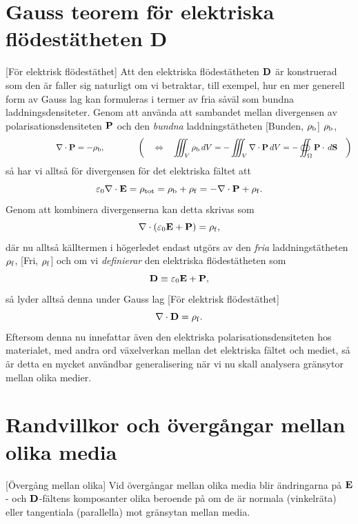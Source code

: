 {{{{{\section{Gauss teorem f{\"o}r elektriska fl{\"o}dest{\"a}theten {\bf D}}
[F{\"o}r elektrisk fl{\"o}dest{\"a}thet]
Att den elektriska fl{\"o}dest{\"a}theten ${\bf D}$
 {\"a}r konstruerad som den
{\"a}r faller sig naturligt om vi betraktar, till exempel, hur en mer generell
form av Gauss lag kan formuleras i termer av fria s{\aa}v{\"a}l som bundna
laddningsdensiteter.
Genom att anv{\"a}nda att sambandet mellan divergensen av
polarisationsdensiteten ${\bf P}$  och
den {\it bundna} laddningst{\"a}theten 
[Bunden, $\rho_{\rm b}$]
$\rho_{\rm b}$,
$$
  \qquad
  \qquad
  \qquad
  \nabla\cdot{\bf P} = -\rho_{\rm b},
  \qquad\qquad
  \bigg(\quad\Leftrightarrow\quad
  \iiint_V \rho_{\rm b}\,dV
    = -\iiint_V\nabla\cdot{\bf P}\,dV
    = -\oiint_{\Omega}{\bf P}\cdot\,d{\bf S}
    \quad\bigg)
$$
s{\aa} har vi allts{\aa} f{\"o}r divergensen f{\"o}r det elektriska f{\"a}ltet
att
$$
  \varepsilon_0\nabla\cdot{\bf E}
    =\rho_{\rm tot}
    =\rho_{\rm b}+\rho_{\rm f}
    =-\nabla\cdot{\bf P}+\rho_{\rm f}.
$$
Genom att kombinera divergenserna kan detta skrivas som
$$
  \nabla\cdot(\varepsilon_0{\bf E}+{\bf P})=\rho_{\rm f},
$$
d{\"a}r nu allts{\aa} k{\"a}lltermen i h{\"o}gerledet endast utg{\"o}rs av den
{\it fria} laddningst{\"a}theten $\rho_{\rm f}$,
[Fri, $\rho_{\rm f}$]
och om vi {\it definierar} den elektriska fl{\"o}dest{\"a}theten som
$$
  {\bf D}\equiv\varepsilon_0{\bf E}+{\bf P},
$$
s{\aa} lyder allts{\aa} denna under Gauss lag
[F{\"o}r elektrisk fl{\"o}dest{\"a}thet]
$$
  \nabla\cdot{\bf D}=\rho_{\rm f}.
$$
Eftersom denna nu innefattar {\"a}ven den elektriska polarisationsdensiteten
 hos materialet, med andra ord
v{\"a}xelverkan mellan det elektriska f{\"a}ltet och mediet, s{\aa} {\"a}r
detta en mycket anv{\"a}ndbar generalisering n{\"a}r vi nu skall analysera
gr{\"a}nsytor mellan olika medier.
\vfill\eject

\section{Randvillkor och {\"o}verg{\aa}ngar mellan olika media}
[{\"O}verg{\aa}ng mellan olika]
Vid {\"o}verg{\aa}ngar mellan olika media blir {\"a}ndringarna p{\aa}
${\bf E}$- och ${\bf D}$-f{\"a}ltens komposanter olika bero\-ende p{\aa} om
de {\"a}r  normala (vinkelr{\"a}ta) eller tangentiala (parallella) mot
gr{\"a}nsytan mellan media.

}}}}}
